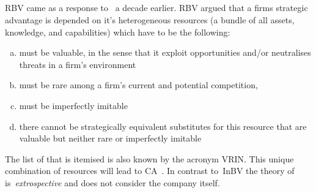 \subsection{} %

\Gls{RBV} came as a response to~\cite{Porter:1980} a decade earlier.
\Gls{RBV} argued that a firms strategic advantage is depended on it's heterogeneous resources (a bundle of all assets, knowledge, and capabilities) which have to be the following:

\begin{enumerate}[(a)]
   \setlength{\itemsep}{1pt}
\item must be valuable, in the sense that it exploit opportunities and/or neutralises threats in a firm’s environment
\item must be rare among a firm’s current and potential competition, 
\item must be imperfectly imitable
\item  there cannot be strategically equivalent substitutes for this resource that are valuable but neither rare or imperfectly imitable 
\end{enumerate} 
The list of that is itemised is also known by the acronym VRIN\@.
This unique combination of resources will lead to \gls{CA}~\cite{Barney:1991}. 
In contrast to~\gls{InBV} the theory of~\cite{Barney:1991} is~\emph{extrospective} and does not consider the company itself.
